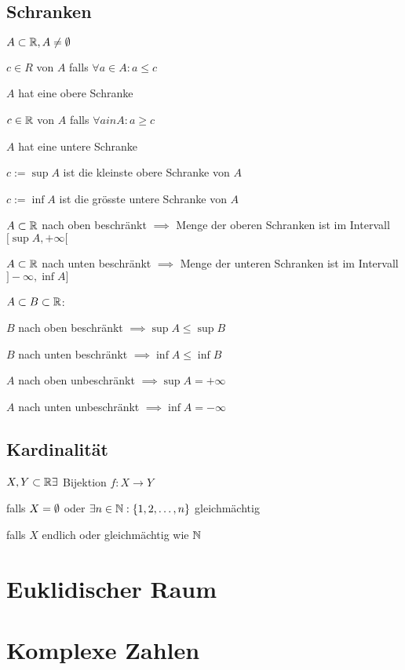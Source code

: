 \subsection{Schranken}
\begin{compactdesc}
    \item[Teilmenge:] $A \subset \mathbb{R}, A \neq \emptyset$
    \item[Obere Schranke:] $c \in R$ von $A$ falls  $\forall a \in A: a \le c$
    \item[Nach Oben Beschränkt:] $A$ hat eine obere Schranke
    \item[Untere Schranke:] $c \in \mathbb{R}$ von $A$ falls $\forall a in A: a \ge c$
    \item[Nach Unten Beschränkt:] $A$ hat eine untere Schranke
    \item[Supremum:] $c:= \sup A$ ist die kleinste obere Schranke von $A$
    \item[Infimum] $c:= \inf A$ ist die grösste untere Schranke von $A$
\end{compactdesc}

\begin{compactenum}
    \item $A \subset \mathbb{R}$ nach oben beschränkt $\implies$ Menge der oberen Schranken ist  im Intervall $[\sup A, +\infty[$
    \item $A \subset \mathbb{R}$ nach unten beschränkt $\implies$ Menge der unteren Schranken ist  im Intervall $]-\infty, \inf A]$
\end{compactenum}

$A \subset  B \subset  \mathbb{R}$:
\begin{compactenum}
    \item $B$ nach oben beschränkt $\implies \sup A \le \sup B$
    \item $B$ nach unten beschränkt $\implies \inf A \le \inf B$
\end{compactenum}

\begin{compactenum}
    \item $A$ nach oben unbeschränkt $\implies \sup A = +\infty$
    \item $A$ nach unten unbeschränkt $\implies \inf A = -\infty$
\end{compactenum}

\subsection{Kardinalität}
\begin{compactdesc}
    \item[Gleichmächtig:] $X,Y \subset \mathbb{R} \exists$ Bijektion $f : X \to Y$
    \item[Endlich:] falls $X = \emptyset$ oder $\exists n \in \mathbb{N}: \{1, 2, \ldots, n\}$ gleichmächtig
    \item[Abzählbar:] falls $X$ endlich oder gleichmächtig wie $\mathbb{N}$
\end{compactdesc}

\section{Euklidischer Raum}
\section{Komplexe Zahlen}
